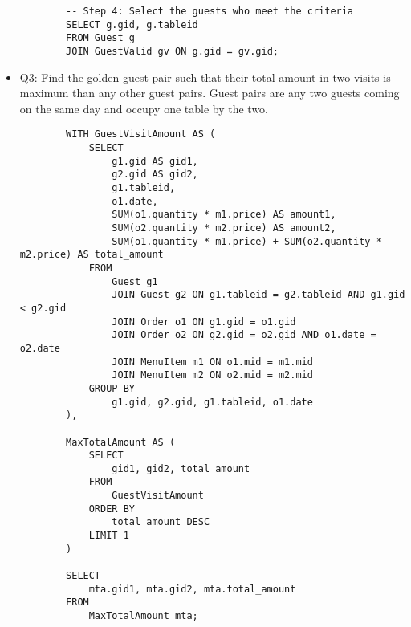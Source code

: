 \documentclass{article}
\begin{document}
\begin{itemize}
\begin{verbatim}
        -- Step 4: Select the guests who meet the criteria
        SELECT g.gid, g.tableid
        FROM Guest g
        JOIN GuestValid gv ON g.gid = gv.gid;
    \end{verbatim}
    \item Q3: Find the golden guest pair such that their total amount in two visits is maximum
    than any other guest pairs. Guest pairs are any two guests coming on the same day
    and occupy one table by the two.
    \begin{verbatim}
        WITH GuestVisitAmount AS (
            SELECT
                g1.gid AS gid1,
                g2.gid AS gid2,
                g1.tableid,
                o1.date,
                SUM(o1.quantity * m1.price) AS amount1,
                SUM(o2.quantity * m2.price) AS amount2,
                SUM(o1.quantity * m1.price) + SUM(o2.quantity * m2.price) AS total_amount
            FROM
                Guest g1
                JOIN Guest g2 ON g1.tableid = g2.tableid AND g1.gid < g2.gid
                JOIN Order o1 ON g1.gid = o1.gid
                JOIN Order o2 ON g2.gid = o2.gid AND o1.date = o2.date
                JOIN MenuItem m1 ON o1.mid = m1.mid
                JOIN MenuItem m2 ON o2.mid = m2.mid
            GROUP BY
                g1.gid, g2.gid, g1.tableid, o1.date
        ),

        MaxTotalAmount AS (
            SELECT
                gid1, gid2, total_amount
            FROM
                GuestVisitAmount
            ORDER BY
                total_amount DESC
            LIMIT 1
        )

        SELECT
            mta.gid1, mta.gid2, mta.total_amount
        FROM
            MaxTotalAmount mta;
    \end{verbatim}
\end{itemize}
\end{document}
